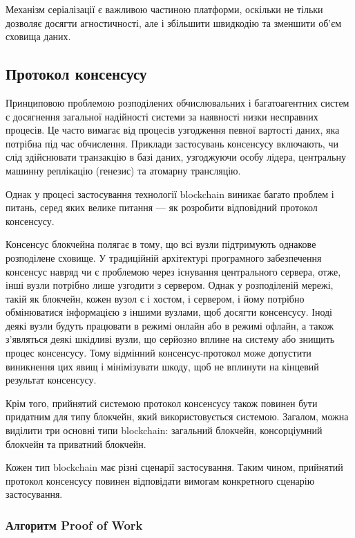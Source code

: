\documentclass{lib/styles/default-style}
\begin{document}
    
    Механізм серіалізації є важливою частиною платформи, оскільки не тільки дозволяє досягти агностичності, але і збільшити
    швидкодію та зменшити об’єм сховища даних.

\subsection{Протокол консенсусу}

    Принциповою проблемою розподілених обчислювальних і багатоагентних систем
    є досягнення загальної надійності системи за наявності низки несправних процесів.
    Це часто вимагає від процесів узгодження певної вартості даних, яка потрібна під час обчислення.
    Приклади застосувань консенсусу включають, чи слід здійснювати транзакцію в базі даних, узгоджуючи особу лідера,
    центральну машинну реплікацію (генезис) та атомарну трансляцію.
    
    Однак у процесі застосування технології blockchain виникає багато проблем і питань,
    серед яких велике питання --- як розробити відповідний протокол консенсусу.

    Консенсус блокчейна полягає в тому, що всі вузли підтримують однакове розподілене сховище.
    У традиційній архітектурі програмного забезпечення консенсус навряд чи є проблемою через існування центрального сервера,
    отже, інші вузли потрібно лише узгодити з сервером. Однак у розподіленій мережі, такій як блокчейн, кожен вузол є і хостом,
    і сервером, і йому потрібно обмінюватися інформацією з іншими вузлами, щоб досягти консенсусу. Іноді деякі вузли будуть
    працювати в режимі онлайн або в режимі офлайн, а також з’являться деякі шкідливі вузли, що серйозно вплине на систему або знищить
    процес консенсусу. Тому відмінний консенсус-протокол може допустити виникнення цих явищ і мінімізувати шкоду,
    щоб не вплинути на кінцевий результат консенсусу.
    
    Крім того, прийнятий системою протокол консенсусу
    також повинен бути придатним для типу блокчейн, який використовується системою. Загалом, можна виділити три основні типи blockchain:
    загальний блокчейн, консорціумний блокчейн та приватний блокчейн.
    
    Кожен тип blockchain має різні сценарії застосування.
    Таким чином, прийнятий протокол консенсусу повинен відповідати вимогам конкретного сценарію застосування.

    \subsubsection{Алгоритм Proof of Work}
\end{document}
